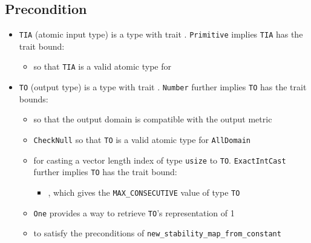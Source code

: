 \documentclass{article}
\begin{document}
\subsection*{Precondition}
\begin{itemize}

    \item \texttt{TIA} (atomic input type) is a type with trait . \texttt{Primitive} implies \texttt{TIA} has the trait bound:
    \begin{itemize}
        \item {} so that \texttt{TIA} is a valid atomic type for 
    \end{itemize}

    \item \texttt{TO} (output type) is a type with trait . \texttt{Number} further implies \texttt{TO} has the trait bounds:
    \begin{itemize}
        \item {} so that the output domain is compatible with the output metric
        \item \texttt{CheckNull} so that \texttt{TO} is a valid atomic type for \texttt{AllDomain}
        \item {} for casting a vector length index of type \texttt{usize} to \texttt{TO}. \texttt{ExactIntCast} further implies \texttt{TO} has the trait bound:
        \begin{itemize}
            \item {}, which gives the \texttt{MAX\_CONSECUTIVE} value of type \texttt{TO}
        \end{itemize}
        
        \item \texttt{One} provides a way to retrieve \texttt{TO}'s representation of 1
        \item {} to satisfy the preconditions of \texttt{new\_stability\_map\_from\_constant}
    \end{itemize}
\end{itemize}
\end{document}
